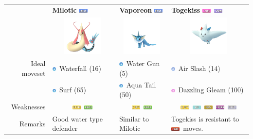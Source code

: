 \documentclass[12pt]{beamer}
\newcommand{\fightingfull}{\includegraphics[height=0.2cm]{../../images/type/full/Fighting.png}}
\newcommand{\electricfull}{\includegraphics[height=0.2cm]{../../images/type/full/Electric.png}}
\newcommand{\fairyfull}{\includegraphics[height=0.2cm]{../../images/type/full/Fairy.png}}
\newcommand{\flyingfull}{\includegraphics[height=0.2cm]{../../images/type/full/Flying.png}}
\newcommand{\grassfull}{\includegraphics[height=0.2cm]{../../images/type/full/Grass.png}}
\newcommand{\icefull}{\includegraphics[height=0.2cm]{../../images/type/full/Ice.png}}
\newcommand{\rockfull}{\includegraphics[height=0.2cm]{../../images/type/full/Rock.png}}
\newcommand{\waterfull}{\includegraphics[height=0.2cm]{../../images/type/full/Water.png}}
\newcommand{\poisonfull}{\includegraphics[height=0.2cm]{../../images/type/full/Poison.png}}
\newcommand{\steelfull}{\includegraphics[height=0.2cm]{../../images/type/full/Steel.png}}
\newcommand{\watersimp}{\includegraphics[height=0.2cm]{../../images/type/simplified/water.png}}
\newcommand{\fairysimp}{\includegraphics[height=0.2cm]{../../images/type/simplified/fairy.png}}
\newcommand{\flyingsimp}{\includegraphics[height=0.2cm]{../../images/type/simplified/flying.png}}
\begin{document}
\begin{frame}
\begin{block}{}
\begin{footnotesize}
\begin{center}
\begin{tabular}{rp{3.2cm}p{3.2cm}p{3.2cm}}
& \textbf{Milotic} \hfill \waterfull & \textbf{Vaporeon} \hfill \waterfull  & \textbf{Togekiss} \hfill \fairyfull~\flyingfull   \\
&\multicolumn{1}{c}{\includegraphics[width=2cm]{../../images/pokemon/Milotic}} &
\multicolumn{1}{c}{\includegraphics[width=2cm]{../../images/pokemon/Vaporeon}} &
\multicolumn{1}{c}{\includegraphics[width=2cm]{../../images/pokemon/Togekiss}} \\ \hline
Ideal moveset & \watersimp~Waterfall (16) & \watersimp~Water Gun (5) & \flyingsimp~Air Slash (14) \\
& \watersimp~Surf (65) & \watersimp~Aqua Tail (50) & \fairysimp~Dazzling Gleam (100)\\  \hline
Weaknesses & \multicolumn{1}{c}{\electricfull~\grassfull} & \multicolumn{1}{c}{\electricfull~\grassfull} & \multicolumn{1}{c}{\electricfull~\icefull~\rockfull~\poisonfull~\steelfull}  \\ \hline
Remarks & Good water type defender & Similar to Milotic & Togekiss is resistant to \fightingfull~moves. 
\end{tabular}
\end{center}


\end{footnotesize}
\end{block}
\end{frame}
\end{document}
